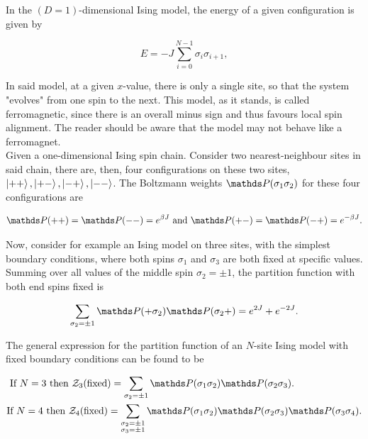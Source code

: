\documentclass{homework}
\begin{document}
In the $(D=1)$-dimensional Ising model, the energy of a given configuration is given by 

\begin{equation}
    E = -J \sum_{i=0}^{N-1} \sigma_i \sigma_{i+1},
\end{equation}

In said model, at a given $x$-value,
there is only a single site, so that the system "evolves" from one spin to the next. This model, as it stands, is called ferromagnetic, since there is an overall minus sign and thus favours local spin alignment. The reader should be aware that the model may not behave like a ferromagnet. \\

Given a one-dimensional Ising spin chain. Consider two nearest-neighbour sites in said chain, there are, then, four configurations on these two sites, $\ket{++}, \ket{+-}, \ket{-+}, \ket{--}$. The Boltzmann weights $\prob(\sigma_1 \sigma_2)$ for these four configurations are 

\begin{equation}
    \prob(++) = \prob(--) = e^{\beta J} \textnormal{  and  } \prob(+-) = \prob(-+) = e^{-\beta J}.
\end{equation}

Now, consider for example an Ising model on three sites, with the simplest boundary conditions, where both spins $\sigma_1$ and $\sigma_3$ are both fixed at specific values. Summing over all values of the middle spin $\sigma_2 = \pm 1$, the partition function with both end spins fixed is 

\begin{equation}
    \sum_{\sigma_2 = \pm 1} \prob(+\sigma_2) \prob(\sigma_2+) = e^{2J} + e^{-2J}.
\end{equation}

The general expression for the partition function of an $N$-site Ising model with fixed boundary conditions can be found to be 

\begin{equation*}
\begin{split}
&\textnormal{ If $N = 3$ then } \mathcal{Z}_3(\textnormal{fixed}) =
    \sum_{\sigma_2 = \pm 1} \prob(\sigma_1\sigma_2) \prob(\sigma_2\sigma_3).  \\
&\textnormal{If $N = 4$ then } \mathcal{Z}_4(\textnormal{fixed}) = \sum_{\substack{\sigma_2 = \pm 1\\
    \sigma_3 = \pm 1}} \prob(\sigma_1\sigma_2) \prob(\sigma_2\sigma_3) \prob(\sigma_3\sigma_4). 
\end{split}
\end{equation*}
\end{document}

